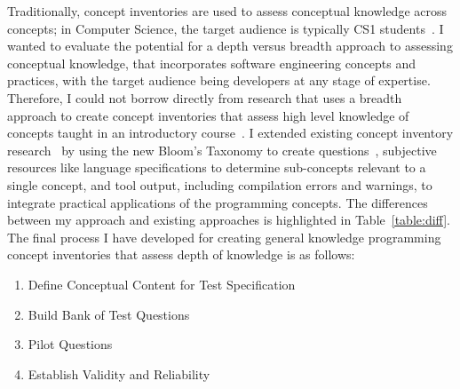Traditionally, concept inventories are used to  assess conceptual knowledge across concepts; in Computer Science, the target audience is typically CS1 students~\cite{tew2010developing,kaczmarczyk2010identifying}. 
I wanted to evaluate the potential for a depth versus breadth approach to assessing conceptual knowledge, that incorporates software engineering concepts and practices, with the target audience being developers at any stage of expertise.
Therefore, I could not borrow directly from research that uses a breadth approach to create concept inventories that assess high level knowledge of concepts taught in an introductory course~\cite{tew2010assessing}. I extended existing concept inventory research~\cite{tew2010developing,nelson1967testing} by using the new Bloom's Taxonomy to create questions~\cite{scott2003bloom,thompson2008bloom, starr2008bloom}, subjective resources like language specifications to determine sub-concepts relevant to a single concept, and tool output, including compilation errors and warnings, to integrate practical applications of the programming concepts. The differences between my approach and existing approaches is highlighted in Table~\ref{table:diff}.
The final process I have developed for creating general knowledge programming concept inventories that assess depth of knowledge is as follows:

\begin{enumerate}
    \item Define Conceptual Content for Test Specification
    \item Build Bank of Test Questions
    \item Pilot Questions
    \item Establish Validity and Reliability
\end{enumerate}




